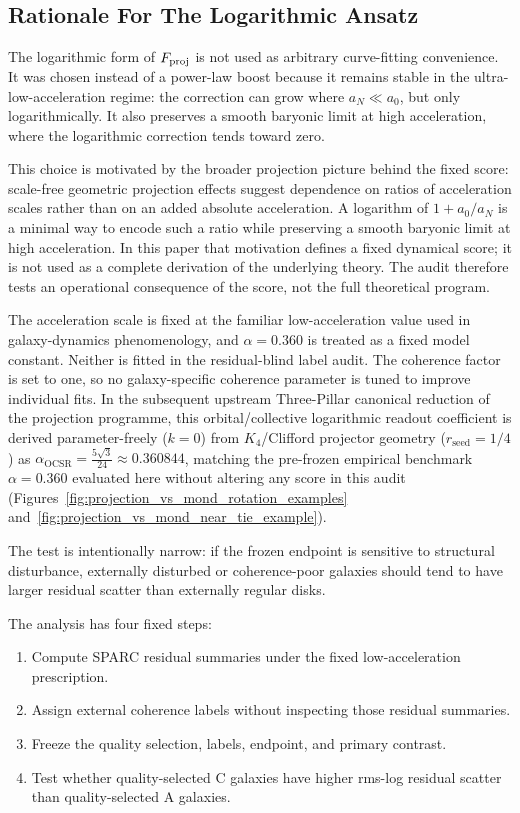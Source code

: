\documentclass[11pt]{article}
\begin{document}
\subsection{Rationale For The Logarithmic Ansatz}
The logarithmic form of $F_{\rm proj}$ is not used as arbitrary curve-fitting convenience. It was chosen instead of a power-law boost because it remains stable in the ultra-low-acceleration regime: the correction can grow where $a_N \ll a_0$, but only logarithmically. It also preserves a smooth baryonic limit at high acceleration, where the logarithmic correction tends toward zero.

This choice is motivated by the broader projection picture behind the fixed score: scale-free geometric projection effects suggest dependence on ratios of acceleration scales rather than on an added absolute acceleration. A logarithm of $1 + a_0/a_N$ is a minimal way to encode such a ratio while preserving a smooth baryonic limit at high acceleration. In this paper that motivation defines a fixed dynamical score; it is not used as a complete derivation of the underlying theory. The audit therefore tests an operational consequence of the score, not the full theoretical program.

The acceleration scale is fixed at the familiar low-acceleration value used in galaxy-dynamics phenomenology, and $\alpha = 0.360$ is treated as a fixed model constant. Neither is fitted in the residual-blind label audit. The coherence factor is set to one, so no galaxy-specific coherence parameter is tuned to improve individual fits. In the subsequent upstream Three-Pillar canonical reduction of the projection programme, this orbital/collective logarithmic readout coefficient is derived parameter-freely ($k=0$) from $K_4$/Clifford projector geometry ($r_{\mathrm{seed}}=1/4$) as $\alpha_{\mathrm{OCSR}} = \frac{5\sqrt{3}}{24} \approx 0.360844$, matching the pre-frozen empirical benchmark $\alpha = 0.360$ evaluated here without altering any score in this audit (Figures~\ref{fig:projection_vs_mond_rotation_examples} and~\ref{fig:projection_vs_mond_near_tie_example}).

The test is intentionally narrow: if the frozen endpoint is sensitive to structural disturbance, externally disturbed or coherence-poor galaxies should tend to have larger residual scatter than externally regular disks.

The analysis has four fixed steps:

\begin{enumerate}
\item Compute SPARC residual summaries under the fixed low-acceleration prescription.
\item Assign external coherence labels without inspecting those residual summaries.
\item Freeze the quality selection, labels, endpoint, and primary contrast.
\item Test whether quality-selected C galaxies have higher rms-log residual scatter than quality-selected A galaxies.
\end{enumerate}
\end{document}
